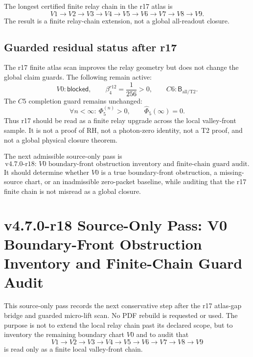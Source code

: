 \begin{corollary}
\label{cor:v470-r17-finite-chain-status}
The longest certified finite relay chain in the r17 atlas is
\[
V1\to V2\to V3\to V4\to V5\to V6\to V7\to V8\to V9.
\]
The result is a finite relay-chain extension, not a global all-readout closure.
\end{corollary}

\subsection{Guarded residual status after r17}
\label{subsec:v470-r17-guarded-residual-status}

The r17 finite atlas scan improves the relay geometry but does not change the
global claim guards.  The following remain active:
\[
V0:\mathsf{blocked},
\qquad
\beta_4^{r12}=\frac1{256}>0,
\qquad
C6:\mathsf B_{\mathrm{all/T2}}.
\]
The \(C5\) completion guard remains unchanged:
\[
\forall n<\infty:\ \Phi_5^{(n)}>0,
\qquad
\widehat\Phi_5(\infty)=0.
\]
Thus r17 should be read as a finite relay upgrade across the local valley-front
sample.  It is not a proof of RH, not a photon-zero identity, not a T2 proof,
and not a global physical closure theorem.

\begin{corollary}
\label{cor:v470-r17-permitted-r18-direction}
The next admissible source-only pass is
\[
\text{v4.7.0-r18: }V0\text{ boundary-front obstruction inventory and finite-chain guard audit.}
\]
It should determine whether \(V0\) is a true boundary-front obstruction, a
missing-source chart, or an inadmissible zero-packet baseline, while auditing
that the r17 finite chain is not misread as a global closure.
\end{corollary}



\section{v4.7.0-r18 Source-Only Pass: V0 Boundary-Front Obstruction Inventory and Finite-Chain Guard Audit}
\label{sec:v470-r18-v0-boundary-front-guard-audit}

This source-only pass records the next conservative step after the r17
atlas-gap bridge and guarded micro-lift scan.  No PDF rebuild is requested or
used.  The purpose is not to extend the local relay chain past its declared
scope, but to inventory the remaining boundary chart \(V0\) and to audit that
\[
V1\to V2\to V3\to V4\to V5\to V6\to V7\to V8\to V9
\]
is read only as a finite local valley-front chain.

